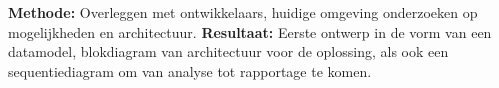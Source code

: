 \textbf{Methode:} Overleggen met ontwikkelaars, huidige omgeving onderzoeken op mogelijkheden en architectuur.
\textbf{Resultaat:} Eerste ontwerp in de vorm van een datamodel, blokdiagram van architectuur voor de oplossing, als ook een sequentiediagram om van analyse tot rapportage te komen.
%
%
%
%
